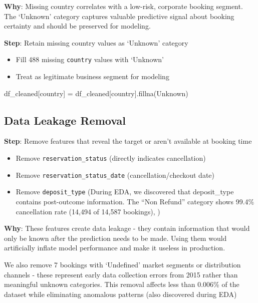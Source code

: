 \documentclass[
  letterpaper,
  DIV=11,
  numbers=noendperiod]{scrartcl}
\newenvironment{Shaded}{\begin{snugshade}}{\end{snugshade}}
\newcommand{\NormalTok}[1]{\textcolor[rgb]{0.00,0.23,0.31}{#1}}
\newcommand{\OperatorTok}[1]{\textcolor[rgb]{0.37,0.37,0.37}{#1}}
\newcommand{\StringTok}[1]{\textcolor[rgb]{0.13,0.47,0.30}{#1}}
\providecommand{\tightlist}{%
  \setlength{\itemsep}{0pt}\setlength{\parskip}{0pt}}
\renewenvironment{Shaded}{%
  \begin{tcolorbox}[%
    enhanced,%
    colback=codebg,%
    colframe=codebg,%
    borderline west={3pt}{0pt}{sectionblue},%
    fontupper=\small\ttfamily,%
    boxrule=0pt,%
    arc=0pt,%
    boxsep=5pt,%
    left=2mm,%
    right=2mm,%
    top=2mm,%
    bottom=2mm%
  ]%
}{%
  \end{tcolorbox}%
}
\begin{document}
\textbf{Why}: Missing country correlates with a low-risk, corporate
booking segment. The `Unknown' category captures valuable predictive
signal about booking certainty and should be preserved for modeling.

\textbf{Step}: Retain missing country values as `Unknown' category

\begin{itemize}
\tightlist
\item
  Fill 488 missing \texttt{country} values with `Unknown'
\item
  Treat as legitimate business segment for modeling
\end{itemize}

\begin{Shaded}
\begin{Highlighting}[]
\NormalTok{df\_cleaned[}\StringTok{\textquotesingle{}country\textquotesingle{}}\NormalTok{] }\OperatorTok{=}\NormalTok{ df\_cleaned[}\StringTok{\textquotesingle{}country\textquotesingle{}}\NormalTok{].fillna(}\StringTok{\textquotesingle{}Unknown\textquotesingle{}}\NormalTok{)}
\end{Highlighting}
\end{Shaded}

\subsection{Data Leakage Removal}\label{data-leakage-removal}

\textbf{Step}: Remove features that reveal the target or aren't
available at booking time

\begin{itemize}
\tightlist
\item
  Remove \texttt{reservation\_status} (directly indicates cancellation)
\item
  Remove \texttt{reservation\_status\_date} (cancellation/checkout date)
\item
  Remove \texttt{deposit\_type} (During EDA, we discovered that
  deposit\_type contains post-outcome information. The ``Non Refund''
  category shows 99.4\% cancellation rate (14,494 of 14,587 bookings), )
\end{itemize}

\textbf{Why}: These features create data leakage - they contain
information that would only be known after the prediction needs to be
made. Using them would artificially inflate model performance and make
it useless in production.

We also remove 7 bookings with `Undefined' market segments or
distribution channels - these represent early data collection errors
from 2015 rather than meaningful unknown categories. This removal
affects less than 0.006\% of the dataset while eliminating anomalous
patterns (also discovered during EDA)
\end{document}
